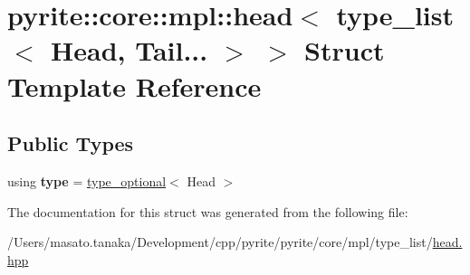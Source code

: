 \hypertarget{structpyrite_1_1core_1_1mpl_1_1head_3_01type__list_3_01_head_00_01_tail_8_8_8_01_4_01_4}{}\section{pyrite\+:\+:core\+:\+:mpl\+:\+:head$<$ type\+\_\+list$<$ Head, Tail... $>$ $>$ Struct Template Reference}
\label{structpyrite_1_1core_1_1mpl_1_1head_3_01type__list_3_01_head_00_01_tail_8_8_8_01_4_01_4}
\subsection*{Public Types}
\begin{DoxyCompactItemize}
\item 
\mbox{\label{structpyrite_1_1core_1_1mpl_1_1head_3_01type__list_3_01_head_00_01_tail_8_8_8_01_4_01_4_a8f35fada089de528196ad3a16b9c978b}} 
using {\bfseries type} = \mbox{\hyperlink{structpyrite_1_1core_1_1mpl_1_1type__optional}{type\+\_\+optional}}$<$ Head $>$
\end{DoxyCompactItemize}


The documentation for this struct was generated from the following file\+:\begin{DoxyCompactItemize}
\item 
/\+Users/masato.\+tanaka/\+Development/cpp/pyrite/pyrite/core/mpl/type\+\_\+list/\mbox{\hyperlink{core_2mpl_2type__list_2head_8hpp}{head.\+hpp}}\end{DoxyCompactItemize}
